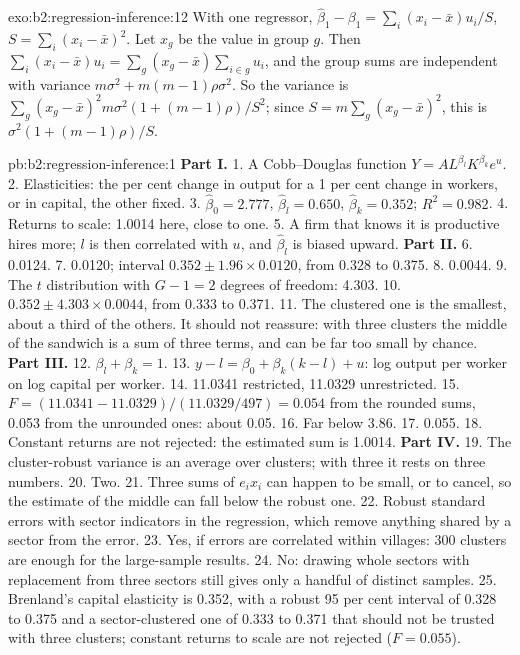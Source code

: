 \begin{solution}{exo:b2:regression-inference:12}
With one regressor, $\hat\beta_1 - \beta_1 = \sum_i(x_i - \bar x)u_i/S$, $S = \sum_i(x_i - \bar x)^2$. Let $x_g$ be the
value in group $g$. Then $\sum_i(x_i - \bar x)u_i = \sum_g(x_g - \bar x)\sum_{i \in g}u_i$, and the group sums are
independent with variance $m\sigma^2 + m(m - 1)\rho\sigma^2$. So the variance is $\sum_g(x_g - \bar x)^2m\sigma^2(1 + (m -
1)\rho)/S^2$; since $S = m\sum_g(x_g - \bar x)^2$, this is $\sigma^2(1 + (m - 1)\rho)/S$.
\end{solution}

\begin{solution}{pb:b2:regression-inference:1}
\textbf{Part I.}
1. A Cobb--Douglas function $Y = AL^{\beta_l}K^{\beta_k}e^u$.
2. Elasticities: the per cent change in output for a 1 per cent change in workers, or in capital, the other fixed.
3. $\hat\beta_0 = 2.777$, $\hat\beta_l = 0.650$, $\hat\beta_k = 0.352$; $R^2 = 0.982$.
4. Returns to scale: 1.0014 here, close to one.
5. A firm that knows it is productive hires more; $l$ is then correlated with $u$, and $\hat\beta_l$ is biased upward.
\textbf{Part II.}
6. 0.0124.
7. 0.0120; interval $0.352 \pm 1.96 \times 0.0120$, from 0.328 to 0.375.
8. 0.0044.
9. The $t$ distribution with $G - 1 = 2$ degrees of freedom: 4.303.
10. $0.352 \pm 4.303 \times 0.0044$, from 0.333 to 0.371.
11. The clustered one is the smallest, about a third of the others. It should not reassure: with three clusters the middle of the
sandwich is a sum of three terms, and can be far too small by chance.
\textbf{Part III.}
12. $\beta_l + \beta_k = 1$.
13. $y - l = \beta_0 + \beta_k(k - l) + u$: log output per worker on log capital per worker.
14. 11.0341 restricted, 11.0329 unrestricted.
15. $F = (11.0341 - 11.0329)/(11.0329/497) = 0.054$ from the rounded sums, 0.053 from the unrounded ones: about 0.05.
16. Far below 3.86.
17. 0.055.
18. Constant returns are not rejected: the estimated sum is 1.0014.
\textbf{Part IV.}
19. The cluster-robust variance is an average over clusters; with three it rests on three numbers.
20. Two.
21. Three sums of $e_ix_i$ can happen to be small, or to cancel, so the estimate of the middle can fall below the robust one.
22. Robust standard errors with sector indicators in the regression, which remove anything shared by a sector from the
error.
23. Yes, if errors are correlated within villages: 300 clusters are enough for the large-sample results.
24. No: drawing whole sectors with replacement from three sectors still gives only a handful of distinct samples.
25. Brenland's capital elasticity is 0.352, with a robust 95 per cent interval of 0.328 to 0.375 and a sector-clustered
one of 0.333 to 0.371 that should not be trusted with three clusters; constant returns to scale are not rejected ($F =
0.055$).
\end{solution}
